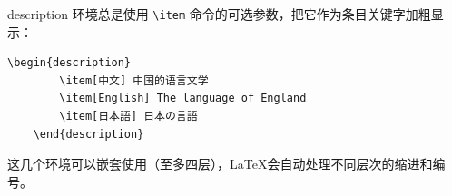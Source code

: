 \begin{center}
\end{center}
description 环境总是使用 \verb|\item| 命令的可选参数，把它作为条目关键字加粗显示：
\clearpage
\begin{lstlisting}[caption=enumerate环境]
    \begin{description}
        \item[中文] 中国的语言文学 
        \item[English] The language of England
        \item[日本語] 日本の言語
    \end{description}
\end{lstlisting}

\begin{center}
\end{center}
这几个环境可以嵌套使用（至多四层），\LaTeX 会自动处理不同层次的缩进和编号。